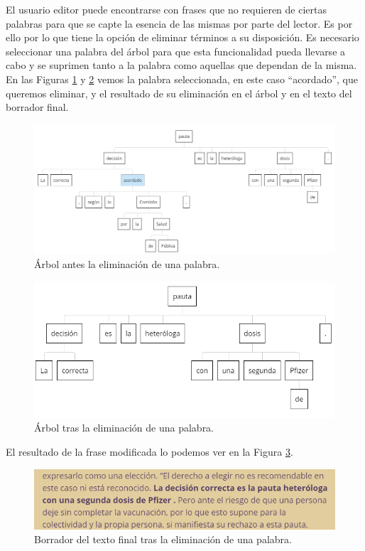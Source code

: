 El usuario editor puede encontrarse con frases que no requieren de ciertas palabras para que se capte la esencia de las mismas por parte del lector. Es por ello por lo que tiene la opción de eliminar términos a su disposición. Es necesario seleccionar una palabra del árbol para que esta funcionalidad pueda llevarse a cabo y se suprimen tanto a la palabra como aquellas que dependan de la misma. En las Figuras \ref{fig:eliminacionPrevia} y \ref{fig:eliminacion} vemos la palabra seleccionada, en este caso ``acordado'', que queremos eliminar, y el resultado de su eliminación en el árbol y en el texto del borrador final.
	 \begin{figure}[h!]
	\centering
	
	
	\includegraphics[scale=0.6]{Imagenes/Figuras/EleccionEliminacion}
	
	
	\caption{Árbol antes la eliminación de una palabra.}
	\label{fig:eliminacionPrevia}
\end{figure} 
	 \begin{figure}[h!]
	\centering
	
	
	\includegraphics[scale=0.9]{Imagenes/Figuras/EliminacionSubarbol}
	
	
	\caption{Árbol tras la eliminación de una palabra.}
	\label{fig:eliminacion}
\end{figure} 
El resultado de la frase modificada lo podemos ver en la Figura \ref{fig:resultadoEliminar}.
	 \begin{figure}[h!]
	\centering
	
	
	\includegraphics[scale=1]{Imagenes/Figuras/BorradorEliminacion}
	
	
	\caption{Borrador del texto final tras la eliminación de una palabra.}
	\label{fig:resultadoEliminar}
\end{figure} 

